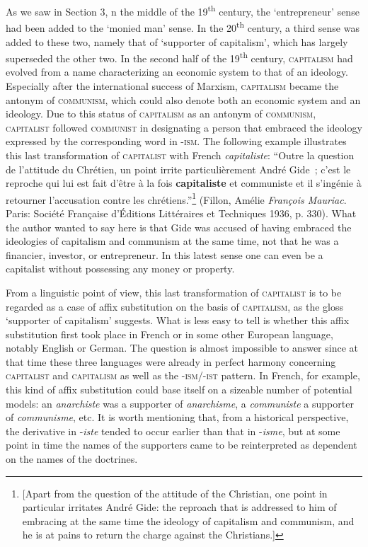 \documentclass[output=paper]{langsci/langscibook}
\begin{document}
As we saw in
Section 3, n the middle of the 19\textsuperscript{th} century, the `entrepreneur' sense had been added to the `monied man'
sense. In the 20\textsuperscript{th} century, a third sense was added to
these two, namely that of `supporter of capitalism', which has largely
superseded the other two. In the second half of the
19\textsuperscript{th} century, \textsc{capitalism} had evolved from a
name characterizing an economic system to that of an ideology.
Especially after the international success of Marxism,
\textsc{capitalism} became the antonym of \textsc{communism}, which
could also denote both an economic system and an ideology.
Due to this status of \textsc{capitalism} as an antonym of
\textsc{communism}, \textsc{capitalist} followed \textsc{communist} in
designating a person that embraced the ideology expressed by the
corresponding word in -\textsc{ism}. The following example illustrates
this last transformation of \textsc{capitalist} with French
\emph{capitaliste}: ``Outre la question de l'attitude du Chrétien, un
point irrite particulièrement André Gide~; c'est le reproche qui lui est
fait d'être à la fois \textbf{capitaliste} et communiste et il s'ingénie
à retourner l'accusation contre les chrétiens.''\footnote{{[}Apart from
  the question of the attitude of the Christian, one point in particular
  irritates André Gide: the reproach that is addressed to him of
  embracing at the same time the ideology of capitalism and communism,
  and he is at pains to return the charge against the Christians.{]}}
(Fillon, Amélie \emph{François Mauriac}. Paris: Société Française
d'Éditions Littéraires et Techniques 1936, p. 330). What the author 
wanted to say here is that Gide was accused of having embraced 
the ideologies of capitalism and communism at the same
time, not that he was a
financier, investor, or entrepreneur. In this latest sense one can even
be a capitalist without possessing any money or property.

From a linguistic point of view, this last transformation of
\textsc{capitalist} is to be regarded as a case of affix substitution on
the basis of \textsc{capitalism}, as the gloss `supporter of capitalism'
suggests. What is less easy to tell is whether this affix substitution
first took place in French or in some other European language, notably
English or German. The question is almost impossible to answer since at
that time these three languages were already in perfect harmony
concerning \textsc{capitalist} and \textsc{capitalism} as well as the
-\textsc{ism}/-\textsc{ist} pattern. In French, for example, this kind
of affix substitution could base itself on a sizeable number of
potential models: an \emph{anarchiste} was a supporter of
\emph{anarchisme}, a \emph{communiste} a supporter of \emph{communisme},
etc. It is worth mentioning that, from a historical perspective, the
derivative in -\emph{iste} tended to occur earlier than that in
-\emph{isme}, but at some point in time the names of the supporters came
to be reinterpreted as dependent on the names of the doctrines.
\end{document}
